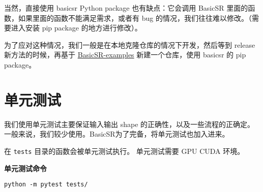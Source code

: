 \documentclass[../main.tex]{subfiles}
\begin{document}
当然，直接使用 basicsr Python package 也有缺点：它会调用 BasicSR 里面的函数，如果里面的函数不能满足需求，或者有 bug 的情况，我们往往难以修改。（需要进入安装 pip package 的地方进行修改）。

为了应对这种情况，我们一般是在本地克隆仓库的情况下开发，然后等到 release 新方法的时候，再基于 \href{https://github.com/xinntao/BasicSR-examples}{BasicSR-examples} 新建一个仓库，使用 basicsr 的 pip package。

\section{单元测试}\label{overview:unit-test}

我们使用单元测试主要保证输入输出 shape 的正确性，以及一些流程的正确定。
一般来说，我们较少使用。BasicSR为了完备，将单元测试也加入进来。

在 \texttt{tests} 目录的函数会被单元测试执行。
单元测试需要 GPU CUDA 环境。

\begin{hl} %
    \textbf{单元测试命令}

    \begin{verbatim}
python -m pytest tests/
    \end{verbatim}
\end{hl}
\end{document}

